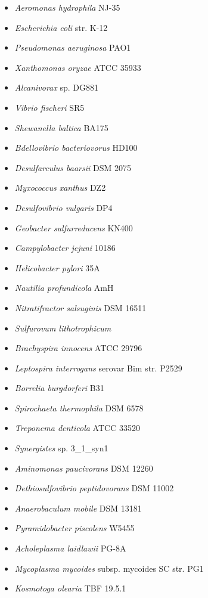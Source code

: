 \begin{itemize}
    \item \textit{Aeromonas hydrophila} NJ-35
    \item \textit{Escherichia coli} str. K-12
    \item \textit{Pseudomonas aeruginosa} PAO1
    \item \textit{Xanthomonas oryzae} ATCC 35933
    \item \textit{Alcanivorax} sp. DG881
    \item \textit{Vibrio fischeri} SR5
    \item \textit{Shewanella baltica} BA175
    \item \textit{Bdellovibrio bacteriovorus} HD100
    \item \textit{Desulfarculus baarsii} DSM 2075
    \item \textit{Myxococcus xanthus} DZ2
    \item \textit{Desulfovibrio vulgaris} DP4
    \item \textit{Geobacter sulfurreducens} KN400
    \item \textit{Campylobacter jejuni} 10186
    \item \textit{Helicobacter pylori} 35A
    \item \textit{Nautilia profundicola} AmH
    \item \textit{Nitratifractor salsuginis} DSM 16511
    \item \textit{Sulfurovum lithotrophicum}
    \item \textit{Brachyspira innocens} ATCC 29796
    \item \textit{Leptospira interrogans} serovar Bim str. P2529
    \item \textit{Borrelia burgdorferi} B31
    \item \textit{Spirochaeta thermophila} DSM 6578
    \item \textit{Treponema denticola} ATCC 33520
    \item \textit{Synergistes} sp. 3\_1\_syn1
    \item \textit{Aminomonas paucivorans} DSM 12260
    \item \textit{Dethiosulfovibrio peptidovorans} DSM 11002
    \item \textit{Anaerobaculum mobile} DSM 13181
    \item \textit{Pyramidobacter piscolens} W5455
    \item \textit{Acholeplasma laidlawii} PG-8A
    \item \textit{Mycoplasma mycoides} subsp. mycoides SC str. PG1
    \item \textit{Kosmotoga olearia} TBF 19.5.1

\end{itemize}

